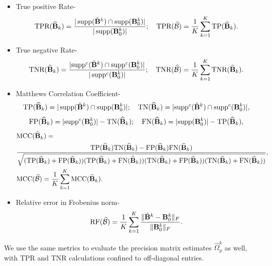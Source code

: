 \begin{itemize}
\item True positive Rate-
%
\[
\text{TPR}(\widehat {{\mathbf{B}}}_k) = \frac{| \operatorname*{supp}(\hat {{\mathbf{B}}}^k) \cap \operatorname*{supp} ({\mathbf{B}}_0^k)|}{| \operatorname*{supp} ({\mathbf{B}}_0^k)|}; \quad
\text{TPR} (\widehat {{\cal{B}}}) = \frac{1}{K} \sum_{k=1}^K \text{TP}(\widehat {{\mathbf{B}}}_k).
\]
\item True negative Rate-
%
\[
\text{TNR}(\widehat {{\mathbf{B}}}_k) = \frac{| {\operatorname*{supp}}^c (\hat {{\mathbf{B}}}^k) \cap {\operatorname*{supp}}^c ({\mathbf{B}}_0^k)|}{| \operatorname*{supp}^c ({\mathbf{B}}_0^k)|}; \quad
\text{TNR} (\widehat {{\cal{B}}}) = \frac{1}{K} \sum_{k=1}^K \text{TNR}(\widehat {{\mathbf{B}}}_k).
\]
%
\item Matthews Correlation Coefficient-
%
$$
\text{TP}(\widehat {{\mathbf{B}}}_k) = | \operatorname*{supp}(\hat {{\mathbf{B}}}^k) \cap \operatorname*{supp} ({\mathbf{B}}_0^k)|; \quad
\text{TN}(\widehat {{\mathbf{B}}}_k) = | {\operatorname*{supp}}^c (\hat {{\mathbf{B}}}^k) \cap {\operatorname*{supp}}^c ({\mathbf{B}}_0^k)|,
$$
$$
\text{FP}(\widehat {{\mathbf{B}}}_k) = | {\operatorname*{supp}}^c ({\mathbf{B}}^k_0) | - \text{TN}(\widehat {{\mathbf{B}}}_k); \quad
\text{FN}(\widehat {{\mathbf{B}}}_k) = | {\operatorname*{supp}} ({\mathbf{B}}^k_0) | - \text{TP}(\widehat {{\mathbf{B}}}_k), $$
\begin{align*}
& \text{MCC} (\widehat {{\mathbf{B}}}_k) = \\
& \frac{ \text{TP}(\widehat {{\mathbf{B}}}_k) \text{TN}(\widehat {{\mathbf{B}}}_k) -
\text{FP}(\widehat {{\mathbf{B}}}_k) \text{FN}(\widehat {{\mathbf{B}}}_k)}
{\sqrt{(\text{TP}(\widehat {{\mathbf{B}}}_k) + \text{FP}(\widehat {{\mathbf{B}}}_k))
(\text{TP}(\widehat {{\mathbf{B}}}_k) + \text{FN}(\widehat {{\mathbf{B}}}_k))
(\text{TN}(\widehat {{\mathbf{B}}}_k) + \text{FP}(\widehat {{\mathbf{B}}}_k))
(\text{TN}(\widehat {{\mathbf{B}}}_k) + \text{FN}(\widehat {{\mathbf{B}}}_k)) }}, \\
& \text{MCC} (\widehat {{\cal{B}}}) = \frac{1}{K} \sum_{k=1}^K \text{MCC}(\widehat {{\mathbf{B}}}_k).
\end{align*}
%
\item Relative error in Frobenius norm-
%
\[
\text{RF} (\widehat {{\cal{B}}}) = \frac{1}{K} \sum_{k=1}^K \frac{\| \hat {{\mathbf{B}}}^k - {\mathbf{B}}_0^k \|_F}{\| {\mathbf{B}}_0^k \|_F}.
\]
%
\end{itemize}
%
We use the same metrics to evaluate the precision matrix estimates $\widehat \Omega_y^k$ as well, with TPR and TNR calculations confined to off-diagonal entries.
